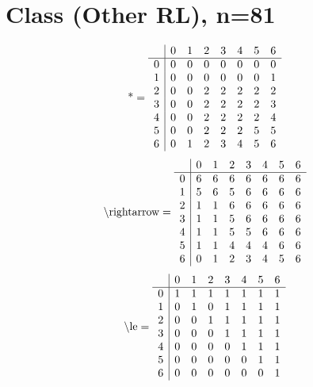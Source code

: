 \documentclass[11pt]{article}
\begin{document}
\section{Class (Other RL), n=81}
\[\text{*} = 
\begin{array}{r | r r r r r r r}
 & 0 & 1 & 2 & 3 & 4 & 5 & 6 \\ \hline
0 & 0 & 0 & 0 & 0 & 0 & 0 & 0 \\
1 & 0 & 0 & 0 & 0 & 0 & 0 & 1 \\
2 & 0 & 0 & 2 & 2 & 2 & 2 & 2 \\
3 & 0 & 0 & 2 & 2 & 2 & 2 & 3 \\
4 & 0 & 0 & 2 & 2 & 2 & 2 & 4 \\
5 & 0 & 0 & 2 & 2 & 2 & 5 & 5 \\
6 & 0 & 1 & 2 & 3 & 4 & 5 & 6 \\
\end{array}
\]
\[\text{\textbackslash rightarrow} = 
\begin{array}{r | r r r r r r r}
 & 0 & 1 & 2 & 3 & 4 & 5 & 6 \\ \hline
0 & 6 & 6 & 6 & 6 & 6 & 6 & 6 \\
1 & 5 & 6 & 5 & 6 & 6 & 6 & 6 \\
2 & 1 & 1 & 6 & 6 & 6 & 6 & 6 \\
3 & 1 & 1 & 5 & 6 & 6 & 6 & 6 \\
4 & 1 & 1 & 5 & 5 & 6 & 6 & 6 \\
5 & 1 & 1 & 4 & 4 & 4 & 6 & 6 \\
6 & 0 & 1 & 2 & 3 & 4 & 5 & 6 \\
\end{array}
\]
\[\text{\textbackslash le} = 
\begin{array}{r | r r r r r r r}
 & 0 & 1 & 2 & 3 & 4 & 5 & 6 \\ \hline
0 & 1 & 1 & 1 & 1 & 1 & 1 & 1 \\
1 & 0 & 1 & 0 & 1 & 1 & 1 & 1 \\
2 & 0 & 0 & 1 & 1 & 1 & 1 & 1 \\
3 & 0 & 0 & 0 & 1 & 1 & 1 & 1 \\
4 & 0 & 0 & 0 & 0 & 1 & 1 & 1 \\
5 & 0 & 0 & 0 & 0 & 0 & 1 & 1 \\
6 & 0 & 0 & 0 & 0 & 0 & 0 & 1 \\
\end{array}
\]
\end{document}
